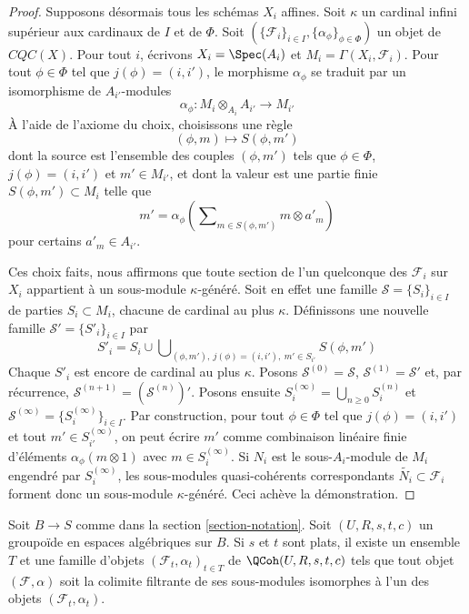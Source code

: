 \begin{proof}
\medskip\noindent
Supposons désormais tous les schémas $X_i$ affines. Soit $\kappa$ un cardinal infini supérieur aux cardinaux de $I$ et de $\Phi$. Soit $(\{\mathcal{F}_i\}_{i \in I}, \{\alpha_\phi\}_{\phi \in \Phi})$ un objet de $\textit{CQC}(X)$. Pour tout $i$, écrivons $X_i = \Spec(A_i)$ et $M_i = \Gamma(X_i, \mathcal{F}_i)$. Pour tout $\phi \in \Phi$ tel que $j(\phi) = (i, i')$, le morphisme $\alpha_\phi$ se traduit par un isomorphisme de $A_{i'}$-modules
$$
\alpha_\phi : M_i \otimes_{A_i} A_{i'} \longrightarrow M_{i'}
$$
À l'aide de l'axiome du choix, choisissons une règle
$$
(\phi, m) \longmapsto S(\phi, m')
$$
dont la source est l'ensemble des couples $(\phi, m')$ tels que $\phi \in \Phi$, $j(\phi) = (i, i')$ et $m' \in M_{i'}$, et dont la valeur est une partie finie $S(\phi, m') \subset M_i$ telle que
$$
m' = \alpha_\phi\left(\sum\nolimits_{m \in S(\phi, m')} m \otimes a'_m\right)
$$
pour certains $a'_m \in A_{i'}$.

\medskip\noindent
Ces choix faits, nous affirmons que toute section de l'un quelconque des $\mathcal{F}_i$ sur $X_i$ appartient à un sous-module $\kappa$-généré. Soit en effet une famille $\mathcal{S} = \{S_i\}_{i \in I}$ de parties $S_i \subset M_i$, chacune de cardinal au plus $\kappa$. Définissons une nouvelle famille $\mathcal{S}' = \{S'_i\}_{i \in I}$ par
$$
S'_i = S_i \cup
\bigcup\nolimits_{(\phi, m'),\ j(\phi) = (i, i'),\ m' \in S_{i'}} S(\phi, m')
$$
Chaque $S'_i$ est encore de cardinal au plus $\kappa$. Posons $\mathcal{S}^{(0)} = \mathcal{S}$, $\mathcal{S}^{(1)} = \mathcal{S}'$ et, par récurrence, $\mathcal{S}^{(n + 1)} = (\mathcal{S}^{(n)})'$. Posons ensuite $S_i^{(\infty)} = \bigcup_{n \geq 0} S_i^{(n)}$ et $\mathcal{S}^{(\infty)} = \{S_i^{(\infty)}\}_{i \in I}$. Par construction, pour tout $\phi \in \Phi$ tel que $j(\phi) = (i, i')$ et tout $m' \in S^{(\infty)}_{i'}$, on peut écrire $m'$ comme combinaison linéaire finie d'éléments $\alpha_\phi(m \otimes 1)$ avec $m \in S_i^{(\infty)}$. Si $N_i$ est le sous-$A_i$-module de $M_i$ engendré par $S_i^{(\infty)}$, les sous-modules quasi-cohérents correspondants $\widetilde{N_i} \subset \mathcal{F}_i$ forment donc un sous-module $\kappa$-généré. Ceci achève la démonstration.
\end{proof}

\begin{lemma}
\label{lemma-set-generators}
Soit $B \to S$ comme dans la section \ref{section-notation}. Soit $(U, R, s, t, c)$ un groupoïde en espaces algébriques sur $B$. Si $s$ et $t$ sont plats, il existe un ensemble $T$ et une famille d'objets $(\mathcal{F}_t, \alpha_t)_{t \in T}$ de $\QCoh(U, R, s, t, c)$ tels que tout objet $(\mathcal{F}, \alpha)$ soit la colimite filtrante de ses sous-modules isomorphes à l'un des objets $(\mathcal{F}_t, \alpha_t)$.
\end{lemma}

